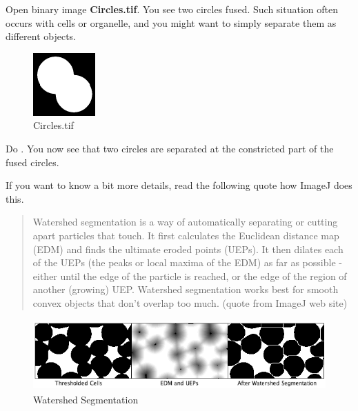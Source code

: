 \begin{indentexercise}{1}
Open binary image \textbf{Circles.tif}. You
see two circles fused. Such situation often occurs with cells or
organelle, and you might want to simply separate them as different
objects. 

\begin{figure}[htbp]
\begin{center}
\includegraphics[width=2.381cm,height=2.408cm]{fig/CMCIBasicCourse201102-img116.png}
\caption{ Circles.tif}
\label{fig:img116}
\end{center}
\end{figure}

Do . You now see that two circles are separated at the
constricted part of the fused circles. 
\end{indentexercise}

If you want to know a bit more details, read the following quote how ImageJ does this.
\begin{quote}
Watershed segmentation is a way of automatically separating or cutting
apart particles that touch. It first calculates the Euclidean distance
map (EDM) and finds the ultimate eroded points (UEPs). It then dilates
each of the UEPs (the peaks or local maxima of the EDM) as far as
possible - either until the edge of the particle is reached, or the
edge of the region of another (growing) UEP. Watershed segmentation
works best for smooth convex objects that don't
overlap too much. (quote from ImageJ web site) 
\end{quote}
\begin{figure}[htbp]
\begin{center}
\includegraphics[width=13.418cm,height=2.701cm]{fig/CMCIBasicCourse201102-img117.png}
\caption{ Watershed Segmentation}
\label{fig:img117}
\end{center}
\end{figure}


